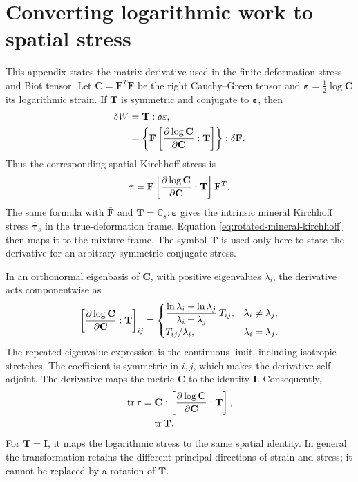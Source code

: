 \section{Converting logarithmic work to spatial stress}
\label{sec:logarithmic-derivative}

This appendix states the matrix derivative used in the finite-deformation
stress and Biot tensor. Let \(\mathbf C=\mathbf F^T\mathbf F\) be the
right Cauchy--Green tensor and \(\mathbf\varepsilon=\tfrac12\log\mathbf C\)
its logarithmic strain. If \(\mathbf T\) is symmetric and conjugate to
\(\mathbf\varepsilon\), then
\begin{align}
 \delta W&=\mathbf T:\delta\mathbf\varepsilon,
 \label{eq:logarithmic-conjugate-work}\\
 &=\left\{\mathbf F\left[\frac{\partial \log\mathbf C}{\partial \mathbf C}:
                         \mathbf T\right]\right\}:\delta\mathbf F.
 \label{eq:logarithmic-work-to-piola}
\end{align}
Thus the corresponding spatial Kirchhoff stress is
\begin{equation}
 \mathbf\tau=\mathbf F\left[\frac{\partial \log\mathbf C}{\partial \mathbf C}:
                         \mathbf T\right]\mathbf F^T.
 \label{eq:log-stress-pushforward}
\end{equation}
The same formula with \(\bar{\mathbf F}\) and
\(\mathbf T=\mathbb{C}_s:\bar{\mathbf\varepsilon}\) gives the intrinsic
mineral Kirchhoff stress \(\widehat{\mathbf\tau}_s\) in the true-deformation
frame. Equation \eqref{eq:rotated-mineral-kirchhoff} then maps it to the
mixture frame. The symbol \(\mathbf T\) is used only here to
state the derivative for an arbitrary symmetric conjugate stress.

In an orthonormal eigenbasis of \(\mathbf C\), with positive eigenvalues
\(\lambda_i\), the derivative acts componentwise as
\begin{equation}
 \left[\frac{\partial \log\mathbf C}{\partial \mathbf C}:\mathbf T\right]_{ij}
 =\begin{cases}
 \dfrac{\ln\lambda_i-\ln\lambda_j}{\lambda_i-\lambda_j}\,T_{ij},
                       &\lambda_i\ne\lambda_j,\\[5pt]
 T_{ij}/\lambda_i,      &\lambda_i=\lambda_j.
 \end{cases}
 \label{eq:log-frechet-spectral-form}
\end{equation}
The repeated-eigenvalue expression is the continuous limit, including
isotropic stretches. The coefficient is symmetric in \(i,j\), which makes
the derivative self-adjoint. The derivative maps the metric \(\mathbf C\)
to the identity \(\mathbf I\).
Consequently,
\begin{align}
 \operatorname{tr}\mathbf\tau
 &=\mathbf C:\left[\frac{\partial \log\mathbf C}{\partial \mathbf C}:\mathbf T\right],
 \label{eq:logarithmic-stress-trace-expansion}\\
 &=\operatorname{tr}\mathbf T.
 \label{eq:logarithmic-stress-trace}
\end{align}
For \(\mathbf T=\mathbf I\), it maps the logarithmic stress to the same
spatial identity. In general the transformation retains the different
principal directions of strain and stress; it cannot be replaced by a
rotation of \(\mathbf T\).
